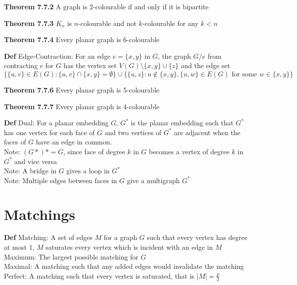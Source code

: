 \documentclass[11pt,notitlepage]{report}
\newcommand{\tbf}[1]{\textbf{#1}}
\begin{document}
\tbf{Theorem 7.7.2} A graph is 2-colourable if and only if it is bipartite

\tbf{Theorem 7.7.3} $K_n$ is $n$-colourable and not $k$-colourable for any $k < n$

\tbf{Theorem 7.7.4} Every planar graph is 6-colourable

\tbf{Def} Edge-Contraction: For an edge $e = \{x, y\}$ in $G$, the graph $G / e$ from contracting $e$ for $G$ has the vertex set $V(G) \setminus \{x,y\} \cup \{z\}$ and the edge set
\vspace{-3mm}
$$\{\{u, v\} \in E(G) : \{u,v\} \cap \{x, y\} = \emptyset\} \cup \{\{u,z\}:u \not \in \{x,y\},\{u,w\} \in E(G) \text{ for some } w \in \{x, y\}\}$$
\vspace{-5mm}

\tbf{Theorem 7.7.6} Every planar graph is 5-colourable

\tbf{Theorem 7.7.7} Every planar graph is 4-colourable

\tbf{Def} Dual: For a planar embedding $G$, $G^*$ is the planar embedding such that $G^*$ has one vertex for each face of $G$ and two vertices of $G^*$ are adjacent when the faces of $G$ have an edge in common.\\
\hspace*{5mm} Note: $(G*)* = G$, since face of degree $k$ in $G$ becomes a vertex of degree $k$ in $G^*$ and vice versa\\
\hspace*{5mm} Note: A bridge in $G$ gives a loop in $G^*$\\
\hspace*{5mm} Note: Multiple edges between faces in $G$ give a multigraph $G^*$


\newpage
\section{Matchings}

\tbf{Def} Matching: A set of edges $M$ for a graph $G$ such that every vertex has degree at most 1, $M$ saturates every vertex which is incident with an edge in $M$\\
\hspace*{5mm} Maximum: The largest possible matching for $G$\\
\hspace*{5mm} Maximal: A matching such that any added edges would invalidate the matching\\
\hspace*{5mm} Perfect: A matching such that every vertex is saturated, that is $|M| = \frac{p}{2}$
\end{document}

